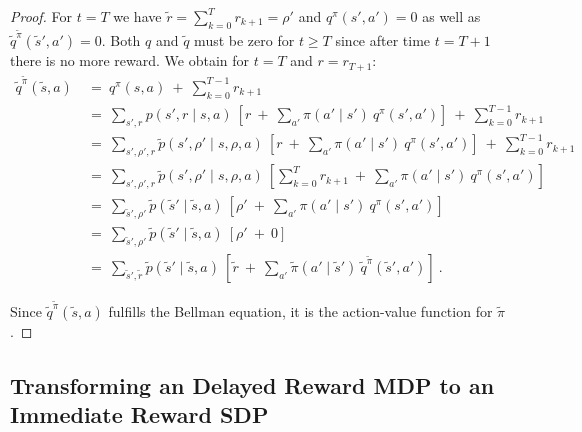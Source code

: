 \documentclass{article}
\renewcommand{\geq}{\geqslant}
\begin{document}
\begin{appendices}
\begin{proof}
For $t=T$ we have $\tilde{r}=\sum_{k=0}^{T}  r_{k+1}=\rho'$ and
$q^\pi(s',a')=0$ as well as $\tilde{q}^{\tilde{\pi}}(\tilde{s}',a')=0$.
Both $q$ and $\tilde{q}$ must be zero for $t\geq T$ since after time $t=T+1$
there is no more reward.
We obtain for $t=T$ and $r=r_{T+1}$:
\begin{align}
  \tilde{q}^{\tilde{\pi}}(\tilde{s},a) \ &= \ q^\pi(s,a) \ + \ \sum_{k=0}^{T-1} 
  r_{k+1} \\ \nonumber
  &= \ \sum_{s',r} p(s',r\mid s,a) \ 
  \left[r \ + \ \sum_{a'} \pi(a' \mid s') \ q^\pi(s',a')  \right]  \ + \ 
  \sum_{k=0}^{T-1}  r_{k+1} \\ \nonumber
  &= \ \sum_{s',\rho', r} \tilde{p}(s',\rho'\mid s,\rho,a) \ 
  \left[ r \ + \ \sum_{a'} \pi(a' \mid s') \ q^\pi(s',a')  \right]  \ + \ 
  \sum_{k=0}^{T-1}  r_{k+1} \\ \nonumber
  &= \ \sum_{s',\rho', r} \tilde{p}(s',\rho'\mid s,\rho,a) \ 
  \left[\sum_{k=0}^{T}  r_{k+1}  \ + \ \sum_{a'} \pi(a' \mid s') \ q^\pi(s',a')  \right]  \\ \nonumber
  &= \ \sum_{\tilde{s}', \rho'} \tilde{p}(\tilde{s}'\mid \tilde{s},a) \ 
  \left[\rho'  \ + \ \sum_{a'} \pi(a' \mid s') \ q^\pi(s',a')  \right]  \\ \nonumber
  &= \ \sum_{\tilde{s}', \rho'} \tilde{p}(\tilde{s}'\mid \tilde{s},a) \ 
  \left[\rho' \ + \ 0  \right]  \\ \nonumber
  &= \  \sum_{\tilde{s}', \tilde{r}} \tilde{p}(\tilde{s}'\mid \tilde{s},a) \ 
  \left[\tilde{r}  \ + \ \sum_{a'} \tilde{\pi}(a' \mid \tilde{s}') \
  \tilde{q}^{\tilde{\pi}}(\tilde{s}',a')
  \right] \ .
\end{align} 


Since $\tilde{q}^{\tilde{\pi}}(\tilde{s},a)$ fulfills the Bellman 
equation, it is the action-value function for $\tilde{\pi}$.

\end{proof}



\subsection{Transforming an Delayed Reward MDP to an Immediate Reward SDP}
\label{sec:AdelayIm}


\end{appendices}
\end{document}
